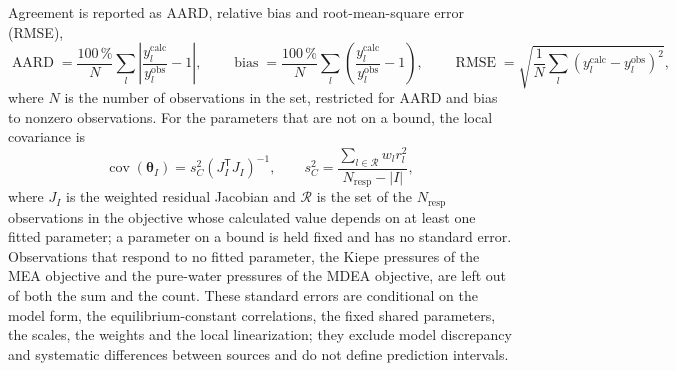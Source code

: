 Agreement is reported as AARD, relative bias and root-mean-square error (RMSE),
\begin{equation}
 \operatorname{AARD}=\frac{100\,\%}{N}\sum_l\left|\frac{y_l^{\mathrm{calc}}}{y_l^{\mathrm{obs}}}-1\right|,
 \qquad \operatorname{bias}=\frac{100\,\%}{N}\sum_l\left(\frac{y_l^{\mathrm{calc}}}{y_l^{\mathrm{obs}}}-1\right),
 \qquad \operatorname{RMSE}=\sqrt{\frac1N\sum_l(y_l^{\mathrm{calc}}-y_l^{\mathrm{obs}})^2},
 \label{eq:aard}
\end{equation}
where $N$ is the number of observations in the set, restricted for AARD and bias to nonzero observations.
For the parameters that are not on a bound, the local covariance is
\begin{equation}
 \operatorname{cov}(\boldsymbol\theta_I)=s_C^2(J_I^{\mathsf T}J_I)^{-1},\qquad
 s_C^2=\frac{\sum_{l\in\mathcal R}w_lr_l^2}{N_{\mathrm{resp}}-|I|},
 \label{eq:conditional-covariance}
\end{equation}
where $J_I$ is the weighted residual Jacobian and $\mathcal R$ is the set of the $N_{\mathrm{resp}}$ observations in the objective whose calculated value depends on at least one fitted parameter; a parameter on a bound is held fixed and has no standard error.
Observations that respond to no fitted parameter, the Kiepe pressures of the MEA objective and the pure-water pressures of the MDEA objective, are left out of both the sum and the count.
These standard errors are conditional on the model form, the equilibrium-constant correlations, the fixed shared parameters, the scales, the weights and the local linearization; they exclude model discrepancy and systematic differences between sources and do not define prediction intervals.

